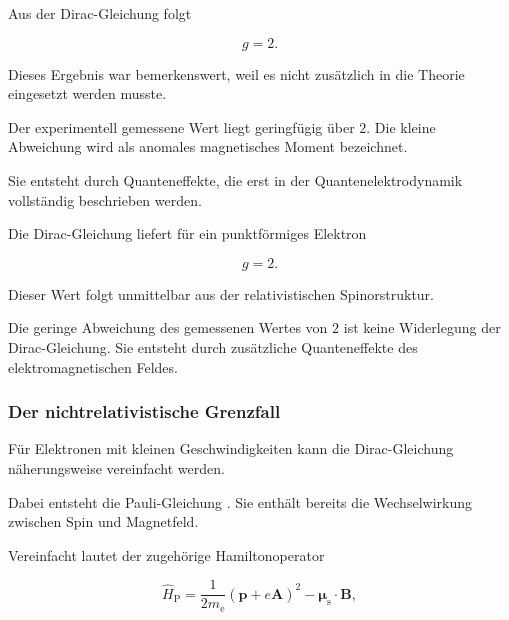 Aus der Dirac-Gleichung folgt

\begin{equation}
	g
	=
	2.
	\label{eq:g_faktor_aus_dirac_spin}
\end{equation}

Dieses Ergebnis war bemerkenswert, weil es nicht zusätzlich in die
Theorie eingesetzt werden musste.

Der experimentell gemessene Wert liegt geringfügig über \(2\). Die
kleine Abweichung wird als anomales magnetisches Moment%
 bezeichnet.

Sie entsteht durch Quanteneffekte, die erst in der
Quantenelektrodynamik%
vollständig beschrieben werden.

\begin{PhysicsBox}
	\label{box:dirac_vorhersage_g_faktor}
	
	Die Dirac-Gleichung liefert für ein punktförmiges Elektron
	
	\begin{equation}
		g=2.
	\end{equation}
	
	Dieser Wert folgt unmittelbar aus der relativistischen
	Spinorstruktur.
	
	Die geringe Abweichung des gemessenen Wertes von \(2\) ist keine
	Widerlegung der Dirac-Gleichung. Sie entsteht durch zusätzliche
	Quanteneffekte des elektromagnetischen Feldes.
\end{PhysicsBox}

\subsubsection*{Der nichtrelativistische Grenzfall}

Für Elektronen mit kleinen Geschwindigkeiten kann die Dirac-Gleichung
näherungsweise vereinfacht werden.

Dabei entsteht die Pauli-Gleichung%
. Sie enthält bereits
die Wechselwirkung zwischen Spin und Magnetfeld.

Vereinfacht lautet der zugehörige Hamiltonoperator

\begin{equation}
	\hat{H}_{\mathrm P}
	=
	\frac{1}{2m_{\mathrm e}}
	\left(
	\hat{\mathbf{p}}
	+
	e\mathbf{A}
	\right)^2
	-
	\boldsymbol{\mu}_{\mathrm s}
	\cdot
	\mathbf{B},
	\label{eq:pauli_hamiltonoperator_aus_dirac}
\end{equation}

